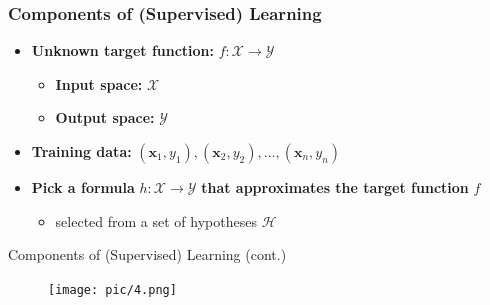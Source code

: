 \documentclass[serif, aspectratio=169]{beamer}
\begin{document}
\begin{frame}
    \frametitle{Components of (Supervised) Learning}

    \begin{itemize}
        \item \textbf{Unknown target function:} \( f : \mathcal{X} \to \mathcal{Y} \)
        \begin{itemize}
            \item \textbf{Input space:} \( \mathcal{X} \)
            \item \textbf{Output space:} \( \mathcal{Y} \)
        \end{itemize}
        
        \vspace{0.5cm} %
        
        \item \textbf{Training data:} \( (\mathbf{x}_1, y_1), (\mathbf{x}_2, y_2), \ldots, (\mathbf{x}_n, y_n) \)
        
        \vspace{0.5cm}
        
        \item \textbf{Pick a formula} \( h : \mathcal{X} \to \mathcal{Y} \) \textbf{that approximates the target function} \( f \)
        \begin{itemize}
            \item selected from a set of hypotheses \( \mathcal{H} \)
        \end{itemize}
    \end{itemize}
    
\end{frame}


\begin{frame}{Components of (Supervised) Learning (cont.)}
    \begin{minipage}{0.95\textwidth}
        \begin{figure}[h]
          \centering
          \texttt{[image: pic/4.png]}
        \end{figure}
    \end{minipage}
    \vfill
\end{frame}
\end{document}
